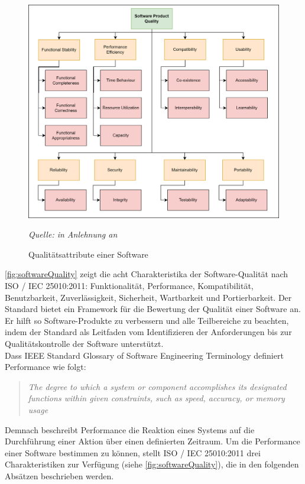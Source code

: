 \begin{figure}[h]
	\centering
	\includegraphics[width=\linewidth]{./images/SoftwareQualityAttributes.png}
	\caption{Qualitätsattribute einer Software}
	\label{fig:softwareQuality}
	\textit{Quelle: in Anlehnung an \cite{.2022}}
\end{figure}

\noindent
\autoref{fig:softwareQuality} zeigt die acht Charakteristika der Software-Qualität nach ISO / IEC 25010:2011: Funktionalität, Performance, Kompatibilität, Benutzbarkeit, Zuverlässigkeit, Sicherheit, Wartbarkeit und Portierbarkeit. Der Standard bietet ein Framework für die Bewertung der Qualität einer Software an. Er hilft so Software-Produkte zu verbessern und alle Teilbereiche zu beachten, indem der Standard als Leitfaden vom Identifizieren der Anforderungen bis zur Qualitätskontrolle der Software unterstützt.\cite{ISOIEC.}\\

\noindent
Dass IEEE Standard Glossary of Software Engineering Terminology definiert Performance wie folgt:
\begin{quote}
	\emph{\grqq{}The degree to which a system or component accomplishes its designated functions within given constraints, such as speed, accuracy, or memory usage\grqq{}} \cite{IEEE.}
\end{quote}

\noindent
Demnach beschreibt Performance die Reaktion eines Systems auf die Durchführung einer Aktion über einen definierten Zeitraum. Um die Performance einer Software bestimmen zu können, stellt ISO / IEC 25010:2011 drei Charakteristiken zur Verfügung (siehe \autoref{fig:softwareQuality}), die in den folgenden Absätzen beschrieben werden.\\

